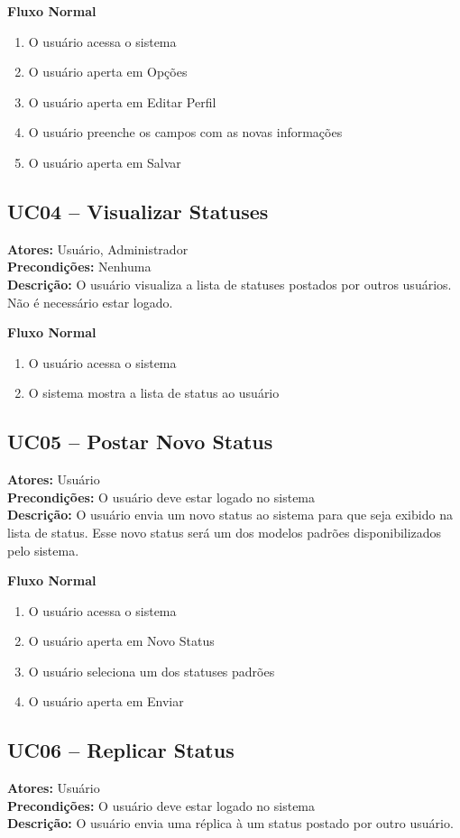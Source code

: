 \documentclass[12pt]{article}
\begin{document}
\textbf{Fluxo Normal}
\begin{enumerate}
  \item O usuário acessa o sistema
  \item O usuário aperta em Opções
  \item O usuário aperta em Editar Perfil
  \item O usuário preenche os campos com as novas informações
  \item O usuário aperta em Salvar
\end{enumerate}

\subsection{UC04 -- Visualizar Statuses}
\textbf{Atores:} Usuário, Administrador \\
\textbf{Precondições:} Nenhuma \\
\textbf{Descrição:} O usuário visualiza a lista de statuses postados por outros usuários. Não é necessário estar logado.

\textbf{Fluxo Normal}
\begin{enumerate}
  \item O usuário acessa o sistema
  \item O sistema mostra a lista de status ao usuário
\end{enumerate}

\subsection{UC05 -- Postar Novo Status}
\textbf{Atores:} Usuário \\
\textbf{Precondições:} O usuário deve estar logado no sistema \\
\textbf{Descrição:} O usuário envia um novo status ao sistema para que seja exibido na lista de status. Esse novo status será um dos modelos padrões disponibilizados pelo sistema.

\textbf{Fluxo Normal}
\begin{enumerate}
  \item O usuário acessa o sistema
  \item O usuário aperta em Novo Status
  \item O usuário seleciona um dos statuses padrões
  \item O usuário aperta em Enviar \\
\end{enumerate}

\subsection{UC06 -- Replicar Status}
\textbf{Atores:} Usuário \\
\textbf{Precondições:} O usuário deve estar logado no sistema \\
\textbf{Descrição:} O usuário envia uma réplica à um status postado por outro usuário.
\end{document}
